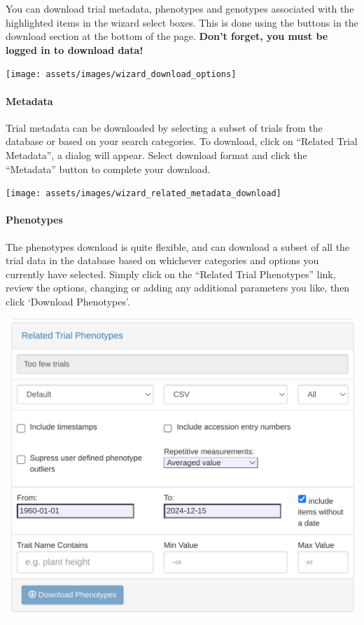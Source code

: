 \documentclass[
  12pt,
]{book}
\begin{document}
You can download trial metadata, phenotypes and genotypes associated with the highlighted items in the wizard select boxes. This is done using the buttons in the download section at the bottom of the page. \textbf{Don't forget, you must be logged in to download data!}

\begin{center}\texttt{[image: assets/images/wizard\_download\_options]} \end{center}

\hypertarget{metadata}{%
\paragraph*{Metadata}\label{metadata}}

Trial metadata can be downloaded by selecting a subset of trials from the database or based on your search categories. To download, click on ``Related Trial Metadata'', a dialog will appear. Select download format and click the ``Metadata'' button to complete your download.

\begin{center}\texttt{[image: assets/images/wizard\_related\_metadata\_download]} \end{center}

\hypertarget{phenotypes}{%
\paragraph*{Phenotypes}\label{phenotypes}}

The phenotypes download is quite flexible, and can download a subset of all the trial data in the database based on whichever categories and options you currently have selected. Simply click on the ``Related Trial Phenotypes'' link, review the options, changing or adding any additional parameters you like, then click `Download Phenotypes'.

\begin{center}\includegraphics[width=0.75\linewidth]{assets/images/wizard_related_phenotypes_download} \end{center}
\end{document}
